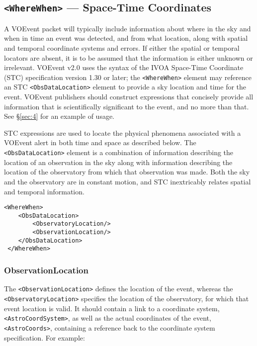 \documentclass[11pt,a4paper]{ivoa}
\begin{document}
\subsection{{\tt <WhereWhen>} --- Space-Time Coordinates}
\label{sec:3.4}

A VOEvent packet will typically include information about where in the sky and
when in time an event was detected, and from what location, along with spatial
and temporal coordinate systems and errors. If either the spatial or temporal
locators are absent, it is to be assumed that the information is either unknown
or irrelevant. VOEvent v2.0 uses the syntax of the IVOA Space-Time Coordinate
(STC) specification version 1.30 or later; the {\tt <WhereWhen>} element may
reference an STC \citep{2007ivoa.spec.1030R} {\tt <ObsDataLocation>} element to
provide a sky location and time for the event. VOEvent publishers should
construct expressions that concisely provide all information that is
scientifically significant to the event, and no more than that. See
\S\ref{sec:4} for an example of usage.

STC expressions are used to locate the physical phenomena associated with a
VOEvent alert in both time and space as described below. The {\tt
<ObsDataLocation>} element is a combination of information describing the
location of an observation in the sky along with information describing the
location of the observatory from which that observation was made. Both the sky
and the observatory are in constant motion, and STC inextricably relates spatial
and temporal information.

\begin{lstlisting}
<WhereWhen>
    <ObsDataLocation>
        <ObservatoryLocation/>
        <ObservationLocation/>
    </ObsDataLocation>
 </WhereWhen>
\end{lstlisting}

\subsubsection{ObservationLocation}
\label{sec:3.4.1}

The {\tt <ObservationLocation>} defines the location of the event, whereas
the {\tt <ObservatoryLocation>} specifies the location of the observatory,
for which that event location is valid. It should contain a link to a
coordinate system, {\tt <AstroCoordSystem>}, as well as the actual coordinates
of the event, {\tt <AstroCoords>}, containing a reference back to the
coordinate system specification. For example:
\end{document}
